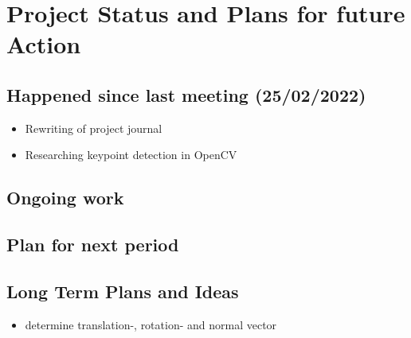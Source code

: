 \chapter{Project Status and Plans for future Action}

\section{Happened since last meeting (25/02/2022)}
\begin{itemize}
    \item Rewriting of project journal
    \item Researching keypoint detection in OpenCV
\end{itemize}
\section{Ongoing work}

\section{Plan for next period}

\section{Long Term Plans and Ideas}
\begin{itemize}
    \item determine translation-, rotation- and normal vector
\end{itemize}